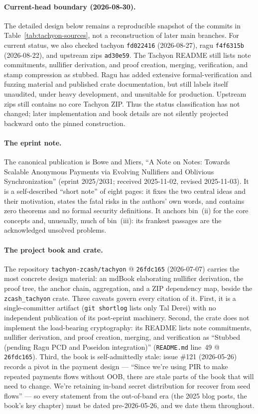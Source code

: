 \documentclass[11pt,a4paper]{article}
\theoremstyle{definition}
\begin{document}
\paragraph{Current-head boundary (2026-08-30).} The detailed design below
remains a reproducible snapshot of the commits in
Table~\ref{tab:tachyon-sources}, not a reconstruction of later main branches.
For current status, we also checked \textsf{tachyon} \texttt{fd022416}
(2026-08-27), \textsf{ragu} \texttt{f4f6315b} (2026-08-22), and upstream
\textsf{zips} \texttt{ad30e59}. The Tachyon README still lists note
commitments, nullifier derivation, and proof creation, merging, verification,
and stamp compression as stubbed. Ragu has added extensive formal-verification
and fuzzing material and published crate documentation, but still labels
itself unaudited, under heavy development, and unsuitable for production.
Upstream \textsf{zips} still contains no core Tachyon ZIP. Thus the status
classification has not changed; later implementation and book details are not
silently projected backward onto the pinned construction.

\paragraph{The eprint note.} The canonical publication is Bowe and Miers, ``A
Note on Notes: Towards Scalable Anonymous Payments via Evolving Nullifiers and
Oblivious Synchronization'' (eprint 2025/2031; received 2025-11-02, revised
2025-11-03). It is a self-described ``short note'' of eight pages: it fixes
the two central ideas and their motivation, states the fatal risks in the
authors' own words, and contains zero theorems and no formal security
definitions. It anchors bin~(ii) for the core concepts and, unusually, much of
bin~(iii): its frankest passages are the acknowledged unsolved problems.

\paragraph{The project book and crate.} The repository
\texttt{tachyon-zcash/tachyon} @ \texttt{26fdc165} (2026-07-07) carries the
most concrete design material: an mdBook elaborating nullifier derivation, the
proof tree, the anchor chain, aggregation, and a ZIP dependency map, beside
the \texttt{zcash\_tachyon} crate. Three caveats govern every citation of it.
First, it is a single-committer artifact (\texttt{git shortlog} lists only Tal
Derei) with no independent publication of its post-eprint machinery. Second,
the crate does not implement the load-bearing cryptography: its README lists
note commitments, nullifier derivation, and proof creation, merging, and
verification as ``Stubbed (pending Ragu PCD and Poseidon integration)''
(\texttt{README.md} line~49 @ \texttt{26fdc165}). Third, the book is
self-admittedly stale: issue \#121 (2026-05-26) records a pivot in the payment
design --- ``Since we're using PIR to make repeated payments flows without
OOB, there are stale parts of the book that will need to change. We're
retaining in-band secret distribution for recover from seed flows'' --- so
every statement from the out-of-band era (the 2025 blog posts, the book's key
chapter) must be dated pre-2026-05-26, and we date them throughout.
\end{document}
